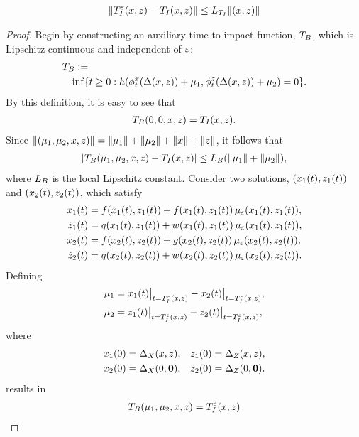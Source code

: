 \documentclass[twocolumn]{article}
\begin{document}
\begin{lemma}
  \begin{align}
    \| T_{I}^{\varepsilon}(x, z) - T_{I}(x, z) \| \leq L_{T_{I}} \| (x, z) \|
    \nonumber
  \end{align}
\end{lemma}
\begin{proof}
  Begin by constructing an auxiliary time-to-impact function, $T_{B}$, which is Lipschitz continuous and independent of $\varepsilon$:
  \begin{align}
    \lefteqn{\TB :=}\\
    \nonumber
    &&\inf \{t \geq 0 : h(\flowtx(\Delta\argsxz) + \mu_{1}, \flowtz(\Delta\argsxz) + \mu_{2}) = 0 \}.
  \end{align}
  By this definition, it is easy to see that
  \begin{align}
    T_{B}(0, 0, x, z) = T_{I}(x, z).
  \end{align}
  Since $\|(\mu_{1}, \mu_{2}, x, z)\| = \|\mu_{1}\| + \|\mu_{2}\| + \|x\| + \|z\|$, it follows that
  \begin{align}
    | T_{B}(\mu_{1}, \mu_{2}, x, z) - T_{I}(x, z)| \leq L_{B} (\| \mu_{1} \| + \| \mu_{2} \|),
  \end{align}
  where $L_{B}$ is the local Lipschitz constant. Consider two solutions, $(x_{1}(t), z_{1}(t))$ and  $(x_{2}(t), z_{2}(t))$, which satisfy
  \begin{align}
    \nonumber
    {\dot {x}}_{1}(t) &= f(x_{1}(t), z_{1}(t)) + f(x_{1}(t), z_{1}(t)) \, \mu_{\varepsilon}(x_{1}(t), z_{1}(t)),\\
    \nonumber
    {\dot {z}}_{1}(t) &= q(x_{1}(t), z_{1}(t)) + w(x_{1}(t), z_{1}(t)) \, \mu_{\varepsilon}(x_{1}(t), z_{1}(t)),\\
    \nonumber
    {\dot {x}}_{2}(t) &= f(x_{2}(t), z_{2}(t)) + g(x_{2}(t), z_{2}(t)) \, \mu_{\varepsilon}(x_{2}(t), z_{2}(t)),\\
    {\dot {z}}_{2}(t) &= q(x_{2}(t), z_{2}(t)) + w(x_{2}(t), z_{2}(t)) \, \mu_{\varepsilon}(x_{2}(t), z_{2}(t)).
  \end{align}
  Defining
  \begin{align}
    \mu_{1} &= x_{1}(t)\big|_{t = T_{I}^{\varepsilon}(x, z)} - x_{2}(t)\big|_{t = T_{I}^{\varepsilon}(x, z)},\\
    \nonumber
    \mu_{2} &= z_{1}(t)\big|_{t = T_{I}^{\varepsilon}(x, z)} - z_{2}(t)\big|_{t = T_{I}^{\varepsilon}(x, z)},
  \end{align}
  where
  \begin{align}
    x_{1}(0) &= \Delta_{X}(x, z),& z_{1}(0) &= \Delta_{Z}(x, z),\\
    x_{2}(0) &= \Delta_{X}(0, {\mathbf 0}),& z_{2}(0) &= \Delta_{Z}(0, {\mathbf 0}).
  \end{align}
  results in
  \begin{align}
    T_{B}(\mu_{1}, \mu_{2}, x, z) = T_{I}^{\varepsilon}(x, z)
  \end{align}


\end{proof}
\end{document}
